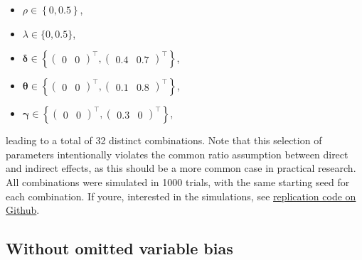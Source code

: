 \documentclass[
  letterpaper,
  DIV=11,
  numbers=noendperiod]{scrreprt}
\providecommand{\tightlist}{%
  \setlength{\itemsep}{0pt}\setlength{\parskip}{0pt}}\usepackage{longtable,booktabs,array}
\begin{document}
\begin{itemize}
\tightlist
\item
  \(\rho \in \left\{ 0, 0.5\right\}\),
\item
  \(\lambda \in \{0, 0.5\}\),
\item
  \({\boldsymbol{\mathbf{\delta}}} \in \left\{ %
  \begin{pmatrix}0&0\end{pmatrix}
  ^\intercal, %
  \begin{pmatrix}0.4&0.7\end{pmatrix}
  ^\intercal\right\}\),
\item
  \({\boldsymbol{\mathbf{\theta}}} \in \left\{%
  \begin{pmatrix}0&0\end{pmatrix}
  ^\intercal, %
  \begin{pmatrix}0.1&0.8\end{pmatrix}
  ^\intercal\right\}\),
\item
  \({\boldsymbol{\mathbf{\gamma}}} \in \left\{%
  \begin{pmatrix}0&0\end{pmatrix}
  ^\intercal, %
  \begin{pmatrix}0.3&0\end{pmatrix}
  ^\intercal\right\}\),
\end{itemize}

leading to a total of 32 distinct combinations. Note that this selection
of parameters intentionally violates the common ratio assumption between
direct and indirect effects, as this should be a more common case in
practical research. All combinations were simulated in 1000 trials, with
the same starting seed for each combination. If youre, interested in the
simulations, see
\href{https://github.com/ruettenauer/Reproduction-Material-Spatial-Monte-Carlo-Experiments}{replication
code on Github}.

\hypertarget{without-omitted-variable-bias}{%
\subsection{Without omitted variable
bias}\label{without-omitted-variable-bias}}
\end{document}
